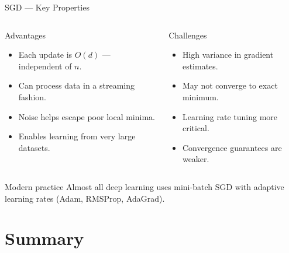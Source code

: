 \begin{frame}{SGD — Key Properties}
  \begin{columns}[T]
    \begin{block}{Advantages}
      \begin{itemize}
        \item Each update is $O(d)$ — independent of $n$.
        \item Can process data in a streaming fashion.
        \item Noise helps escape poor local minima.
        \item Enables learning from very large datasets.
      \end{itemize}
    \end{block}
    \begin{alertblock}{Challenges}
      \begin{itemize}
        \item High variance in gradient estimates.
        \item May not converge to exact minimum.
        \item Learning rate tuning more critical.
        \item Convergence guarantees are weaker.
      \end{itemize}
    \end{alertblock}
  \end{columns}

  \vspace{.5em}
  \begin{exampleblock}{Modern practice}
    Almost all deep learning uses mini-batch SGD with adaptive learning rates
    (Adam, RMSProp, AdaGrad).
  \end{exampleblock}
\end{frame}

\section{Summary}

